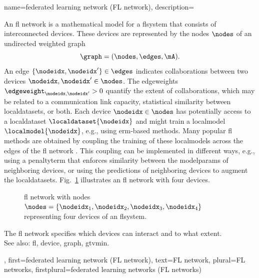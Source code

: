 {name={federated learning network (FL network)},
	description={An \gls{fl} network is a 
		mathematical model for a \gls{flsystem} that consists of interconnected 
		\glspl{device}. These \glspl{device} are represented by the nodes $\nodes$ 
		of an undirected weighted \gls{graph}
		\[
			\graph = (\nodes,\edges,\mA).
		\]
		An edge $\{\nodeidx,\nodeidx'\} \in \edges$ indicates collaborations 
		between two \glspl{device} $\nodeidx, \nodeidx' \in \nodes$. 
		The \glspl{edgeweight} $\edgeweight_{\nodeidx,\nodeidx'} > 0$ 
		quantify the extent of collaborations, which may be related to a 
		communication link capacity, statistical similarity between 
		\glspl{localdataset}, or both. Each \gls{device} $\nodeidx \in \nodes$ 
		has potentially access to a \gls{localdataset} $\localdataset{\nodeidx}$ and 
		might train a \gls{localmodel} $\localmodel{\nodeidx}$, e.g., using 
		\gls{erm}-based methods. Many popular \gls{fl} methods are obtained by 
		coupling the \gls{training} of these \glspl{localmodel} across the edges of the 
		\gls{fl} network \cite{JungFLBook}. This coupling can be implemented in different ways, 
		e.g., using a \gls{penaltyterm} that enforces similarity between the \glspl{modelparam} 
		of neighboring \glspl{device}, or using the \glspl{prediction} of neighboring 
		\glspl{device} to augment the \glspl{localdataset}.
		Fig.\ \ref{fig_fl_network_dict} illustrates an \gls{fl} network with four \glspl{device}.
		\begin{figure}[H]
		\centering
		\caption{\Gls{fl} network with nodes $\nodes=\{\nodeidx_1,\nodeidx_2,\nodeidx_3,\nodeidx_4\}$ 
			representing four \glspl{device} of an \gls{flsystem}. \label{fig_fl_network_dict}}
		\end{figure}
		The \gls{fl} network specifies which \glspl{device} can interact and to what extent. 
	    	\\
		See also: \gls{fl}, \gls{device}, \gls{graph}, \gls{gtvmin}.},
	first={federated learning network (FL network)},
	text={FL network},
	plural={FL networks}, 
	firstplural={federated learning networks (FL networks)}
}


